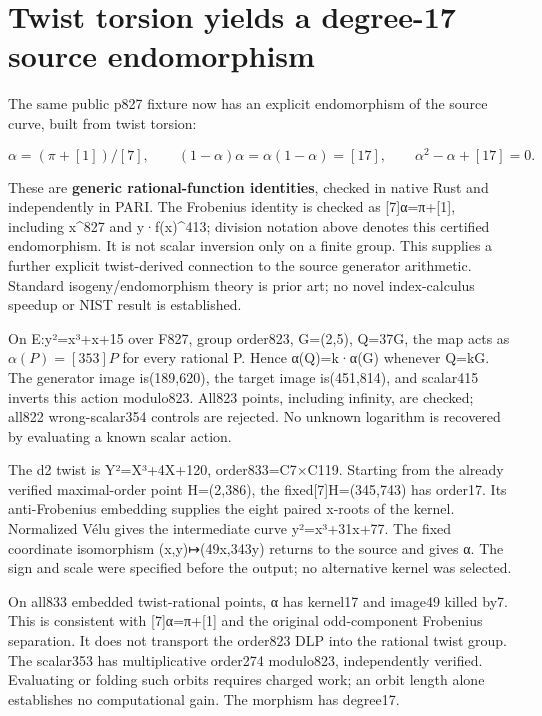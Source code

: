 \documentclass[
  10pt,
]{article}
\author{}
\date{}
\begin{document}
\section{Twist torsion yields a degree-17 source
endomorphism}\label{twist-torsion-yields-a-degree-17-source-endomorphism}

The same public p827 fixture now has an explicit endomorphism of the
source curve, built from twist torsion:

\[
\alpha=(\pi+[1])/[7],\qquad
(1-\alpha)\alpha=\alpha(1-\alpha)=[17],\qquad
\alpha^2-\alpha+[17]=0.
\]

These are \textbf{generic rational-function identities}, checked in
native Rust and independently in PARI. The Frobenius identity is checked
as {[}7{]}α=π+{[}1{]}, including x\^{}827 and y·f(x)\^{}413; division
notation above denotes this certified endomorphism. It is not scalar
inversion only on a finite group. This supplies a further explicit
twist-derived connection to the source generator arithmetic. Standard
isogeny/endomorphism theory is prior art; no novel index-calculus
speedup or NIST result is established.

On E:y²=x³+x+15 over F827, group order823, G=(2,5), Q=37G, the map acts
as \(\alpha(P)=[353]P\) for every rational P. Hence α(Q)=k·α(G) whenever
Q=kG. The generator image is(189,620), the target image is(451,814), and
scalar415 inverts this action modulo823. All823 points, including
infinity, are checked; all822 wrong-scalar354 controls are rejected. No
unknown logarithm is recovered by evaluating a known scalar action.

The d2 twist is Y²=X³+4X+120, order833=C7×C119. Starting from the
already verified maximal-order point H=(2,386), the
fixed{[}7{]}H=(345,743) has order17. Its anti-Frobenius embedding
supplies the eight paired x-roots of the kernel. Normalized Vélu gives
the intermediate curve y²=x³+31x+77. The fixed coordinate isomorphism
(x,y)↦(49x,343y) returns to the source and gives α. The sign and scale
were specified before the output; no alternative kernel was selected.

On all833 embedded twist-rational points, α has kernel17 and image49
killed by7. This is consistent with {[}7{]}α=π+{[}1{]} and the original
odd-component Frobenius separation. It does not transport the order823
DLP into the rational twist group. The scalar353 has multiplicative
order274 modulo823, independently verified. Evaluating or folding such
orbits requires charged work; an orbit length alone establishes no
computational gain. The morphism has degree17.
\end{document}
